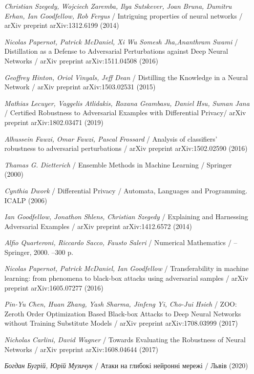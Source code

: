 \documentclass[14pt,a4paper]{extarticle}
\newcounter{e}
\numberwithin{equation}{section}
\numberwithin{figure}{section}
\begin{document}
 \newpage
 \thispagestyle{empty}
 \begin{thebibliography}{99}
	
	\textit{Christian Szegedy, Wojciech Zaremba, Ilya Sutskever, Joan Bruna, Dumitru Erhan, Ian Goodfellow, Rob Fergus} /
	Intriguing properties of neural networks /
	arXiv preprint arXiv:1312.6199 (2014)
	
	\textit{Nicolas Papernot, Patrick McDaniel, Xi Wu Somesh Jha,Ananthram Swami} /
	Distillation as a Defense to Adversarial Perturbations against Deep Neural Networks /
	arXiv preprint arXiv:1511.04508 (2016)
	
	\textit{Geoffrey Hinton, Oriol Vinyals, Jeff Dean} /
	Distilling the Knowledge in a Neural Network /
	arXiv preprint arXiv:1503.02531 (2015)
	
	\textit{Mathias Lecuyer, Vaggelis Atlidakis, Roxana Geambasu, Daniel Hsu, Suman Jana} /
	Certified Robustness to Adversarial Examples with Differential Privacy/
	arXiv preprint arXiv:1802.03471 (2019)
	
	\textit{Alhussein Fawzi, Omar Fawzi, Pascal Frossard} /
	Analysis of classifiers' robustness to adversarial perturbations /
	arXiv preprint arXiv:1502.02590 (2016)
	
	\textit{Thamas G. Dietterich} /
	Ensemble Methods in Machine Learning /
	Springer (2000)
	
	\textit{Cynthia Dwork} /
	Differential Privacy /
	Automata, Languages and Programming. ICALP (2006)
	
	\textit{Ian Goodfellow, Jonathon Shlens, Christian Szegedy} /
	Explaining and Harnessing Adversarial Examples /
	arXiv preprint arXiv:1412.6572 (2014)
	
	\textit{Alfio Quarteroni, Riccardo Sacco, Fausto Saleri} /
	Numerical Mathematics / --
	Springer, 2000. --300 p.
	
	\textit{Nicolas Papernot, Patrick McDaniel, Ian Goodfellow} /
	Transferability in machine learning: from phenomena to black-box attacks using adversarial samples /
	arXiv preprint arXiv:1605.07277 (2016)
	
	\textit{Pin-Yu Chen, Huan Zhang, Yash Sharma, Jinfeng Yi, Cho-Jui Hsieh} /
	ZOO: Zeroth Order Optimization Based Black-box Attacks to Deep Neural Networks without Training Substitute Models /
	arXiv preprint arXiv:1708.03999 (2017)
	
	\textit{Nicholas Carlini, David Wagner} /
	Towards Evaluating the Robustness of Neural Networks /
	arXiv preprint arXiv:1608.04644 (2017)
	
	\textit{Богдан Бугрій, Юрій Музичук} /
	Атаки на глибокі нейронні мережі /
	Львів (2020)
	
	
 \end{thebibliography}

 
\end{document}
